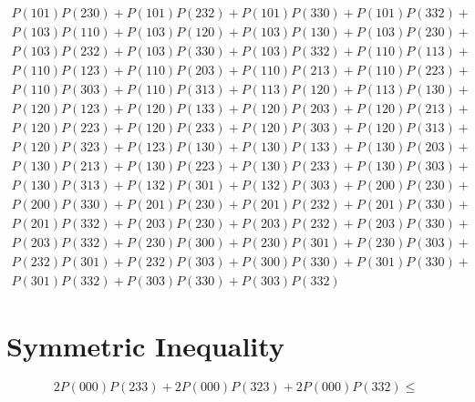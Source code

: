 \documentclass{article}
\theoremstyle{definition}
\begin{document}
\begin{gather*}
    P(101)P(230) + P(101)P(232) + P(101)P(330) + P(101)P(332) + \\
    P(103)P(110) + P(103)P(120) + P(103)P(130) + P(103)P(230) + \\
    P(103)P(232) + P(103)P(330) + P(103)P(332) + P(110)P(113) + \\
    P(110)P(123) + P(110)P(203) + P(110)P(213) + P(110)P(223) + \\
    P(110)P(303) + P(110)P(313) + P(113)P(120) + P(113)P(130) + \\
    P(120)P(123) + P(120)P(133) + P(120)P(203) + P(120)P(213) + \\
    P(120)P(223) + P(120)P(233) + P(120)P(303) + P(120)P(313) + \\
    P(120)P(323) + P(123)P(130) + P(130)P(133) + P(130)P(203) + \\
    P(130)P(213) + P(130)P(223) + P(130)P(233) + P(130)P(303) + \\
    P(130)P(313) + P(132)P(301) + P(132)P(303) + P(200)P(230) + \\
    P(200)P(330) + P(201)P(230) + P(201)P(232) + P(201)P(330) + \\
    P(201)P(332) + P(203)P(230) + P(203)P(232) + P(203)P(330) + \\
    P(203)P(332) + P(230)P(300) + P(230)P(301) + P(230)P(303) + \\
    P(232)P(301) + P(232)P(303) + P(300)P(330) + P(301)P(330) + \\
    P(301)P(332) + P(303)P(330) + P(303)P(332)
    \end{gather*}

    \section*{Symmetric Inequality}

    \[ 2P(000)P(233) + 2P(000)P(323) + 2P(000)P(332) \leq \]
\end{document}
